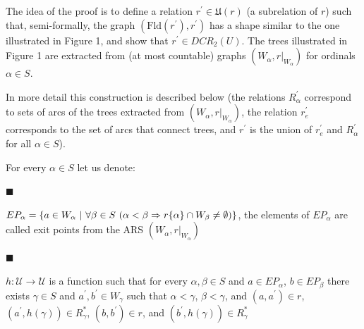 \documentclass[10pt,a4paper]{amsart}
\begin{document}
 
 
The idea of the proof is to define a relation $r^{\prime}\in\mathfrak{U}(r)$ (a subrelation of $r$) such that, semi-formally, the graph $(\mathrm{Fld}(r^{\prime}),r^{\prime})$ has a shape similar to the one illustrated in Figure 1, and show that $r^{\prime}\in DCR_{2}(U)$. The trees illustrated in Figure 1 are extracted from (at most countable) graphs $(W_{\alpha},r|_{W_{\alpha}})$ for ordinals $\alpha\in S$.\par
 
 
 
In more detail this construction is described below (the relations $R^{\prime}_{\alpha}$ correspond to sets of arcs of the trees extracted from $(W_{\alpha},r|_{W_{\alpha}})$, the relation $r_{e}^{\prime}$ corresponds to the set of arcs that connect trees, and $r^{\prime}$ is the union of $r^{\prime}_{e}$ and $R^{\prime}_{\alpha}$ for all $\alpha\in S$).\par
 
 
 
For every $\alpha\in S$ let us denote:\par
  
\par\noindent  $\blacksquare$ 
 
$EP_{\alpha}=\{a\in W_{\alpha}\leavevmode\nobreak\ |\leavevmode\nobreak\ %
\forall\beta\in S\leavevmode\nobreak\ (\alpha<\beta\Rightarrow r\{\alpha\}\cap
W%
_{\beta}\neq\emptyset)\}$, the elements of $EP_{\alpha}$ are called exit points from the ARS $(W_{\alpha},r|_{W_{\alpha}})$\par
 
 
 
\par\noindent  $\blacksquare$ 
 
$h:\mathcal{U}\to\mathcal{U}$ is a function such that for every $\alpha,\beta\in S$ and $a\in EP_{\alpha}$, $b\in EP_{\beta}$ there exists $\gamma\in S$ and $a^{\prime},b^{\prime}\in W_{\gamma}$ such that $\alpha<\gamma$, $\beta<\gamma$, and $(a,a^{\prime})\in r$, $(a^{\prime},h(\gamma))\in R_{\gamma}^{*}$, $(b,b^{\prime})\in r$, and $(b^{\prime},h(\gamma))\in R_{\gamma}^{*}$\par
 
\end{document}
